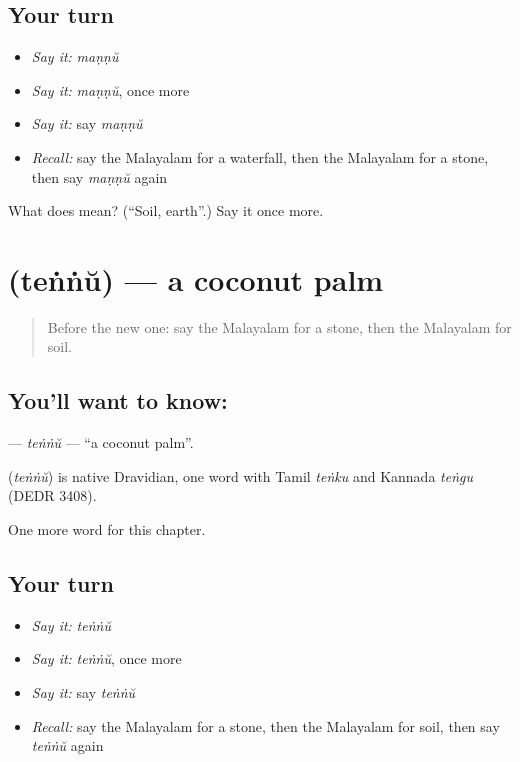 \subsection*{Your turn}
\begin{itemize}
\raggedright
  \item \emph{Say it:} \emph{maṇṇŭ}
  \item \emph{Say it:} \emph{maṇṇŭ}, once more
  \item \emph{Say it:} say \emph{maṇṇŭ}
  \item \emph{Recall:} say the Malayalam for a waterfall, then the Malayalam for a stone, then say \emph{maṇṇŭ} again
\end{itemize}

\begin{tcolorbox}[breakable,colback=teal!4,colframe=teal!35!black,title={Before you move on}]
What does  mean? (\textquotedblleft{}Soil, earth\textquotedblright{}.) Say it once more.
\end{tcolorbox}
\section[\texorpdfstring{\ml{തെങ്ങ്} (teṅṅŭ)}{തെങ്ങ് (teṅṅŭ)}]{ (teṅṅŭ) — a coconut palm}

\label{lesson:ML-C161-tennu}



\begin{quote}
Before the new one: say the Malayalam for a stone, then the Malayalam for soil.
\end{quote}

\subsection*{You'll want to know: }
\textbf{} — \emph{teṅṅŭ} — \textquotedblleft{}a coconut palm\textquotedblright{}.

\begin{cousinweb}
\textbf{} (\emph{teṅṅŭ}) is native Dravidian, one word with Tamil \emph{teṅku} and Kannada \emph{teṅgu} (DEDR 3408).
\end{cousinweb}

\begin{grammarlens}[title={What you've built}]
One more word for this chapter.
\end{grammarlens}

\subsection*{Your turn}
\begin{itemize}
\raggedright
  \item \emph{Say it:} \emph{teṅṅŭ}
  \item \emph{Say it:} \emph{teṅṅŭ}, once more
  \item \emph{Say it:} say \emph{teṅṅŭ}
  \item \emph{Recall:} say the Malayalam for a stone, then the Malayalam for soil, then say \emph{teṅṅŭ} again
\end{itemize}

